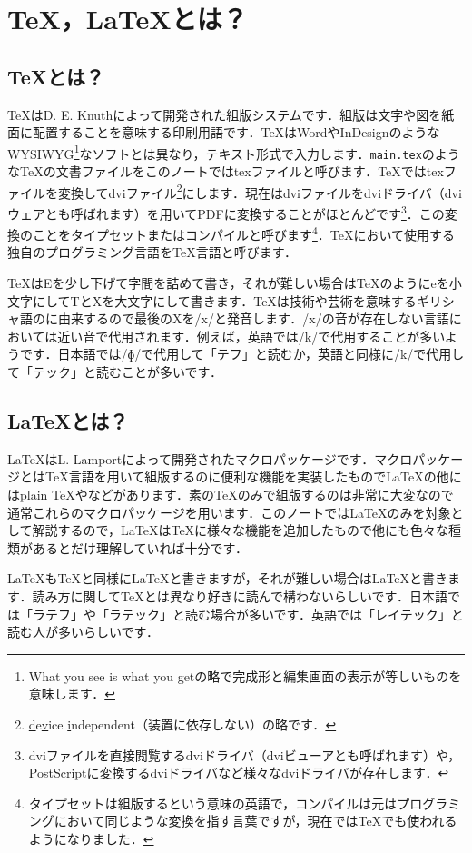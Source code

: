 \section{\TeX，\LaTeX とは？}
\subsection{\TeX とは？}
\TeX はD. E. Knuthによって開発された組版システムです．組版は文字や図を紙面に配置することを意味する印刷用語です．\TeX はWordやInDesignのようなWYSIWYG\footnote{What you see is what you getの略で完成形と編集画面の表示が等しいものを意味します．}なソフトとは異なり，テキスト形式で入力します．\texttt{main.tex}のような\TeX の文書ファイルをこのノートではtexファイルと呼びます．\TeX ではtexファイルを変換してdviファイル\footnote{\underline{d}e\underline{v}ice \underline{i}ndependent（装置に依存しない）の略です．}にします．現在はdviファイルをdviドライバ（dviウェアとも呼ばれます）を用いてPDFに変換することがほとんどです\footnote{dviファイルを直接閲覧するdviドライバ（dviビューアとも呼ばれます）や，PostScriptに変換するdviドライバなど様々なdviドライバが存在します．}．この変換のことをタイプセットまたはコンパイルと呼びます\footnote{タイプセットは組版するという意味の英語で，コンパイルは元はプログラミングにおいて同じような変換を指す言葉ですが，現在では\TeX でも使われるようになりました．}．\TeX において使用する独自のプログラミング言語を\TeX 言語と呼びます．

\TeX はEを少し下げて字間を詰めて書き，それが難しい場合はTeXのようにeを小文字にしてTとXを大文字にして書きます．\TeX は技術や芸術を意味するギリシャ語のに由来するので最後のXを/x/と発音します．/x/の音が存在しない言語においては近い音で代用されます．例えば，英語では/k/で代用することが多いようです．日本語では/ɸ/で代用して「テフ」と読むか，英語と同様に/k/で代用して「テック」と読むことが多いです．

\subsection{\LaTeX とは？}
\LaTeX はL. Lamportによって開発されたマクロパッケージです．マクロパッケージとは\TeX 言語を用いて組版するのに便利な機能を実装したもので\LaTeX の他にはplain \TeX や\ConTeXt などがあります．素の\TeX のみで組版するのは非常に大変なので通常これらのマクロパッケージを用います．このノートでは\LaTeX のみを対象として解説するので，\LaTeX は\TeX に様々な機能を追加したもので他にも色々な種類があるとだけ理解していれば十分です．

\LaTeX も\TeX と同様に\LaTeX と書きますが，それが難しい場合はLaTeXと書きます．読み方に関して\TeX とは異なり好きに読んで構わないらしいです．日本語では「ラテフ」や「ラテック」と読む場合が多いです．英語では「レイテック」と読む人が多いらしいです．

